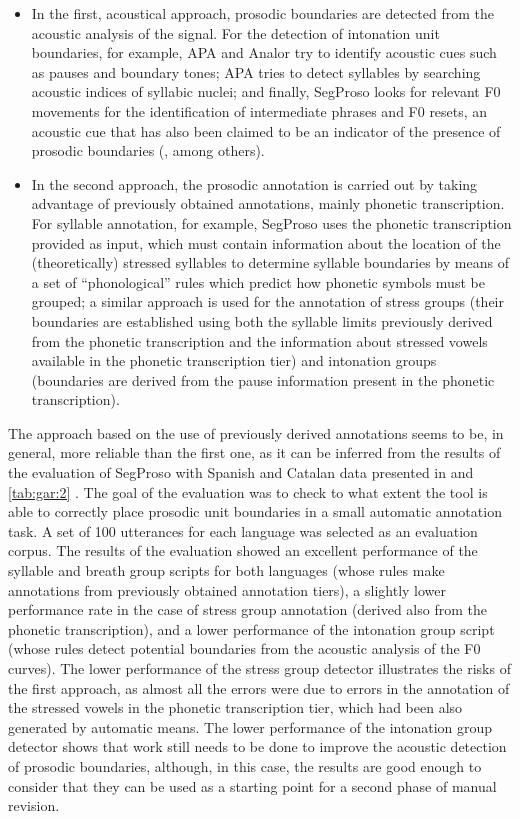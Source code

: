 \documentclass[output=paper]{langsci/langscibook}
\begin{document}
\begin{itemize}
\item In the first, acoustical approach, prosodic boundaries are detected from the acoustic analysis of the signal. For the detection of intonation unit boundaries, for example, APA and Analor try to identify acoustic cues such as pauses and boundary tones; APA tries to detect syllables by searching acoustic indices of syllabic nuclei; and finally, SegProso looks for relevant F0 movements for the identification of intermediate phrases and F0 resets, an acoustic cue that has also been claimed to be an indicator of the presence of prosodic boundaries (\citealt{Garrido1996,Garrido2001}, among others). 
 
\item In the second approach, the prosodic annotation is carried out by taking advantage of previously obtained annotations, mainly phonetic transcription. For syllable annotation, for example, SegProso uses the phonetic transcription provided as input, which must contain information about the location of the (theoretically) stressed syllables to determine syllable boundaries by means of a set of ``phonological'' rules which predict how phonetic symbols must be grouped; a similar approach is used for the annotation of stress groups (their boundaries are established using both the syllable limits previously derived from the phonetic transcription and the information about stressed vowels available in the phonetic transcription tier) and intonation groups (boundaries are derived from the pause information present in the phonetic transcription).
\end{itemize}

The approach based on the use of previously derived annotations seems to be, in general, more reliable than the first one, as it can be inferred from the results of the evaluation of SegProso with Spanish and Catalan data presented in  and \ref{tab:gar:2} \citep{Garrido2013SegProso}. The goal of the evaluation was to check to what extent the tool is able to correctly place prosodic unit boundaries in a small automatic annotation task. A set of 100 utterances for each language was selected as an evaluation corpus. The results of the evaluation showed an excellent performance of the syllable and breath group scripts for both languages (whose rules make annotations from previously obtained annotation tiers), a slightly lower performance rate in the case of stress group annotation (derived also from the phonetic transcription), and a lower performance of the intonation group script (whose rules detect potential boundaries from the acoustic analysis of the F0 curves). The lower performance of the stress group detector illustrates the risks of the first approach, as almost all the errors were due to errors in the annotation of the stressed vowels in the phonetic transcription tier, which had been also generated by automatic means. The lower performance of the intonation group detector shows that work still needs to be done to improve the acoustic detection of prosodic boundaries, although, in this case, the results are good enough to consider that they can be used as a starting point for a second phase of manual revision.
\end{document}
